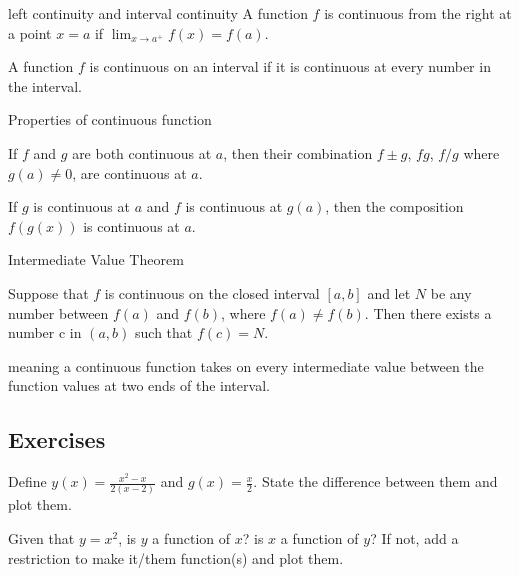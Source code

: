 \documentclass[Calculus 1 Recitation.tex]{subfiles}
\begin{document}
\begin{myleftlinebox}
	left continuity and interval continuity
	\tcblower
	A function $f$ is continuous from the right at a point $x=a$ if $\lim_{x\to a^+} f(x) = f(a)$.

	A function $f$ is continuous on an interval if it is continuous at every number in the interval.
\end{myleftlinebox}

\begin{myleftlinebox}
	Properties of continuous function
	\tcblower
	\begin{theorem}\label{thm:continFunc}
		If $f$ and $g$ are both continuous at $a$, then their combination $f\pm g$, $fg$, $f/g$ where $g(a)\neq 0$, are continuous at $a$.

		If $g$ is continuous at $a$ and $f$ is continuous at $g(a)$, then the composition $f(g(x))$ is continuous at $a$.
	\end{theorem}
\end{myleftlinebox}

\begin{myleftlinebox}
	Intermediate Value Theorem
	\tcblower
	\begin{theorem}\label{thm:intermediateValue}
		Suppose that $f$ is continuous on the closed interval $[a, b]$ and let $N$ be any number between $f(a)$ and $f(b)$, where $f(a) \neq f(b)$. Then there exists a number c in $(a, b)$ such that $f(c) = N$.
	\end{theorem}
	meaning a continuous function takes on every intermediate value between the function values at two ends of the interval.
\end{myleftlinebox}


\subsection{Exercises}

\begin{myleftlinebox}
	Define $y(x) = \frac{x^2-x}{2(x-2)}$ and $g(x) = \frac{x}{2}$. State the difference between them and plot them.
	\tcblower
	\vspace{2em}
\end{myleftlinebox}

\begin{myleftlinebox}
	Given that $y=x^2$, is $y$ a function of $x$? is $x$ a function of $y$? If not, add a restriction to make it/them function(s) and plot them.
	\tcblower
	\vspace{2em}
\end{myleftlinebox}
\end{document}
